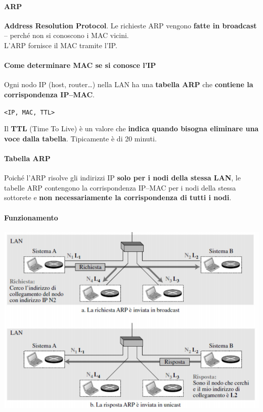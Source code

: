 \documentclass[10pt]{article}
\begin{document}
\paragraph{ARP} \textbf{Address Resolution Protocol}. Le richieste ARP vengono \textbf{fatte in broadcast} -- perché non si conoscono i MAC vicini.\\
L'ARP fornisce il MAC tramite l'IP.
\paragraph{Come determinare MAC se si conosce l'IP} Ogni nodo IP (host, router\ldots) nella LAN ha una \textbf{tabella ARP} che \textbf{contiene la corrispondenza IP--MAC}.
\begin{center}
\texttt{<IP, MAC, TTL>}
\end{center}
Il \textbf{TTL} (Time To Live) è un valore che \textbf{indica quando bisogna eliminare una  voce dalla tabella}. Tipicamente è di 20 minuti.
\paragraph{Tabella ARP} Poiché l'ARP risolve gli indirizzi IP \textbf{solo per i nodi della stessa LAN}, le tabelle ARP contengono la corrispondenza IP--MAC per i nodi della stessa sottorete e \textbf{non necessariamente la corrispondenza di tutti i nodi}.
\paragraph{Funzionamento}
\begin{center}
\includegraphics[scale=0.7]{arpfunz.png}
\end{center}
\pagebreak
\end{document}
